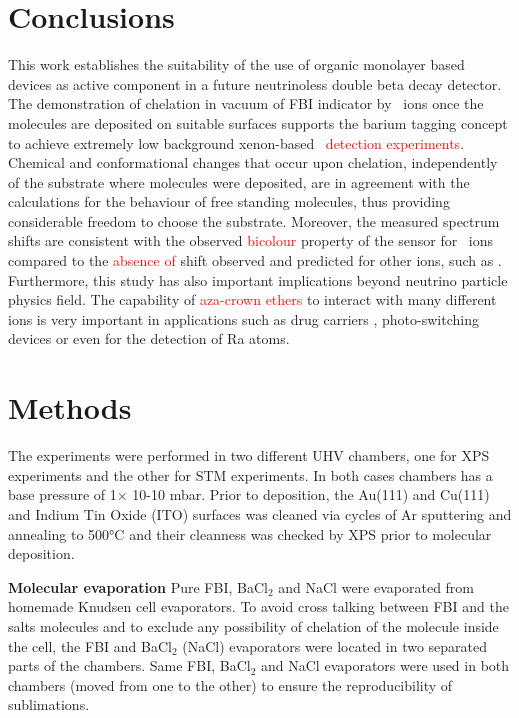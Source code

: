 \documentclass[aps,prl,reprint,longbibliography,superscriptaddress, english]{revtex4-1}
\def\BappCl{BaCl$_2$ }
\begin{document}
\section{Conclusions}
This work establishes the suitability of the use of organic monolayer based devices as active component in a future neutrinoless double beta decay detector.
The demonstration of chelation in vacuum of FBI indicator by \Bapp\ ions once the molecules are deposited on suitable surfaces supports the barium tagging concept to achieve extremely low background xenon-based \bbonu\ \textcolor{red}{detection experiments}. Chemical and conformational changes that occur upon chelation, independently of the substrate where molecules were deposited, are in agreement with the calculations for the behaviour of free standing molecules, thus providing considerable freedom to choose the substrate. Moreover, the measured spectrum shifts are consistent with the observed \textcolor{red}{bicolour} property of the sensor for \Bapp\ ions compared to the \textcolor{red}{absence of} shift observed and predicted for other ions, such as \Nap.  
Furthermore, this study has also important implications beyond neutrino particle physics field. The capability of \textcolor{red}{aza-crown ethers} to interact with many different ions is very important in applications such as drug carriers \cite{uchegbu_non-ionic_1998}, photo-switching devices \cite{malval_photoswitching_2002,uda_membrane_2005} or even for the detection of Ra atoms. 


\section{Methods}
The experiments were performed in two different UHV chambers, one for XPS experiments and the other for STM experiments. In both cases chambers has a base pressure of 1× 10-10 mbar. Prior to deposition, the Au(111) and Cu(111) and Indium Tin Oxide (ITO) surfaces was cleaned via cycles of Ar sputtering and annealing to 500°C and their cleanness was checked by XPS prior to molecular deposition. 

\textbf{Molecular evaporation}
Pure FBI, \BappCl and NaCl were evaporated from homemade Knudsen cell evaporators. To avoid cross talking between FBI and the salts molecules and to exclude any possibility of chelation of the molecule inside the cell, the FBI and \BappCl (NaCl) evaporators were located in two separated parts of the chambers. Same FBI, \BappCl and NaCl evaporators were used in both chambers (moved from one to the other) to ensure the reproducibility of sublimations.
\end{document}
